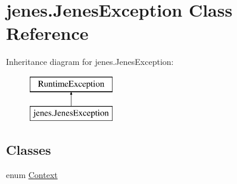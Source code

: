 \hypertarget{classjenes_1_1_jenes_exception}{\section{jenes.\-Jenes\-Exception Class Reference}
\label{classjenes_1_1_jenes_exception}
}
Inheritance diagram for jenes.\-Jenes\-Exception\-:\begin{figure}[H]
\begin{center}
\leavevmode
\includegraphics[height=2.000000cm]{classjenes_1_1_jenes_exception}
\end{center}
\end{figure}
\subsection*{Classes}
\begin{DoxyCompactItemize}
\item 
enum \hyperlink{enumjenes_1_1_jenes_exception_1_1_context}{Context}
\end{DoxyCompactItemize}
